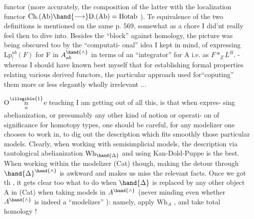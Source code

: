 functor (more accurately, the composition of the latter with the
localization functor $\mathrm{Ch}.(\mathrm{Ab})\hand{\longrightarrow}\allowbreak \mathrm{D}.(\mathrm{Ab}) = \mathrm{Hotab}$ ). Te equivalence of
the two definitions  is mentioned on the same p. 569, somewhat as a
chore I did'nt really feel then to dive into.  Besides the ``block''
against homology, the picture was being obscured too by the ``computati-%
onal'' idea I kept in mind, of expressing $\mathrm{Lp}_{!}^{ab}(F)$ for F in $A^{\hand{\wedge}}_{ab}$ in
terms of an ``integrator'' for A i.e. as $F *_{\underline{Z}} L^{B}.$ - whereas I should
have known best myself that for establishing formal properties relating
various derived functors, the particular  approach used
for``coputing'' them more or less elegantly  wholly irrelevant ...

O$\overset{\illegible{1}}{\underset{n}{n}}$e teaching I am getting out of all this, is that when expres-%
sing abelianization, or presumably any other kind of notion or operati-%
on of significance for homotopy types, one should be careful, for
any modelizer one chooses to work in, to dig out the description which
fits smoothly those particular models. Clearly, when working with
semisimplicial models, the description via tautological abelianization
$\mathrm{Wh}_{\hand{\Delta}}$ and using Kan-Dold-Puppe is the best. When working within the
modelizer (Cat) though, making the detour through $\hand{\Delta}^{\hand{\wedge}}$ is awkward and
makes us  miss  the relevant facts. Once we got th
, it gets clear too what to do when $\hand{\Delta}$ is replaced by any
other object A in (Cat) 
when taking models in $A^{\hand{\wedge}}$ (never minding even whether $A^{\hand{\wedge}}$ is indeed a
``modelizer'' ): namely, apply $\mathrm{Wh}_{A}$ , and take total homology !

